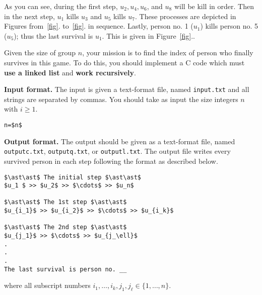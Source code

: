 \documentclass{article}
\begin{document}
As you can see, during the first step, $u_2,u_4,u_6$, and $u_8$ will be kill in order.
Then in the next step, $u_1$ kills $u_3$ and  $u_5$ kills $u_7$. These processes are depicted in Figures 
from~\ref{fig}. to~\ref{fig}. in sequence. Lastly, person no. 1 ($u_1$) kills person no. 5 ($u_5$); thus the last survival is $u_1$.
This is given in Figure~\ref{fig}..

\bigskip
Given the size of group $n$,  your mission is to find the index of person who finally survives in this game.
To do this, you should implement a C code which must \textbf{use a linked list} and \textbf{work recursively}.

\bigskip
\noindent\textbf{Input format.} %
The input is given a text-format file, named \texttt{input.txt} and all strings are separated by commas.
You should take as input the size integers $n$ with $i\geq 1$. 
\begin{lstlisting}[backgroundcolor=\color{yellow!40}]
n=$n$
\end{lstlisting}



\bigskip
\noindent\textbf{Output format.} %
The output should be given as a text-format file, named \texttt{outputc.txt}, \texttt{outputq.txt}, or \texttt{outputl.txt}.
The output file writes every survived person in each step following the format as described below.

\begin{lstlisting}[backgroundcolor=\color{yellow!40}]
$\ast\ast$ The initial step $\ast\ast$
$u_1 $ >> $u_2$ >> $\cdots$ >> $u_n$

$\ast\ast$ The 1st step $\ast\ast$
$u_{i_1}$ >> $u_{i_2}$ >> $\cdots$ >> $u_{i_k}$

$\ast\ast$ The 2nd step $\ast\ast$
$u_{j_1}$ >> $\cdots$ >> $u_{j_\ell}$
.
.
.
The last survival is person no. __
\end{lstlisting}
where all subscript numbers $i_1,\ldots,i_k,j_1,j_\ell\in\{1,\ldots,n\}$.
\end{document}
